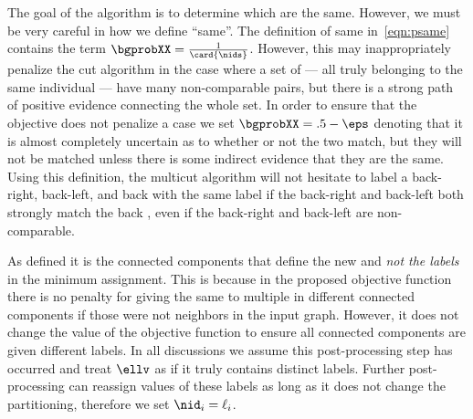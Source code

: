             \gencutfig{}

            The goal of the algorithm is to determine which \annots{} are the
              same.
            However, we must be very careful in how we define ``same''.
            The definition of same in~\cref{eqn:psame} contains the term
              $\bgprobXX=\frac{1}{\card{\nids}}$.
            However, this may inappropriately penalize the cut algorithm in
              the case where a set of \annots{} --- all truly belonging to the
              same individual --- have many non-comparable pairs, but there is a
              strong path of positive evidence connecting the whole set.
            In order to ensure that the objective does not penalize a case we
              set $\bgprobXX=.5 - \eps$ denoting that it is almost completely
              uncertain as to whether or not the two \annots{} match, but they
              will not be matched unless there is some indirect evidence that
              they are the same.
            Using this definition, the multicut algorithm will not hesitate to
              label a back-right, back-left, and back \annot{} with the same
              label if the back-right and back-left both strongly match the back
              \annot{}, even if the back-right and back-left are non-comparable.


            As defined it is the connected components that define the new
              \names{} and \emph{not the labels} in the minimum assignment.
            This is because in the proposed objective function there is no
              penalty for giving the same \name{} to multiple \annots{} in
              different connected components if those \annots{} were not
              neighbors in the input graph.
            However, it does not change the value of the objective function to
              ensure all connected components are given different labels.
            In all discussions we assume this post-processing step has
              occurred and treat $\ellv$ as if it truly contains distinct
              labels.
            Further post-processing can reassign values of these labels as
              long as it does not change the partitioning, therefore we set
              $\nid_i = \ell_i$.

